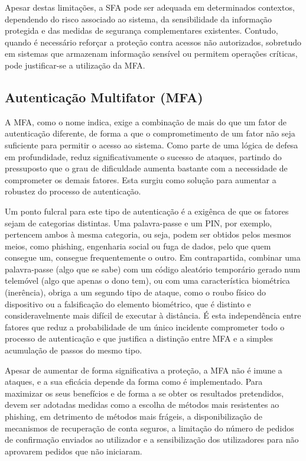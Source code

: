 \hspace{1cm} Apesar destas limitações, a SFA pode ser adequada em determinados contextos, dependendo do risco associado ao sistema, da sensibilidade da informação protegida e das medidas de segurança complementares existentes. Contudo, quando é necessário reforçar a proteção contra acessos não autorizados, sobretudo em sistemas que armazenam informação sensível ou permitem operações críticas, pode justificar-se a utilização da MFA.

\subsection{Autenticação Multifator (MFA)}

\hspace{1cm} A MFA, como o nome indica, exige a combinação de mais do que um fator de autenticação diferente, de forma a que o comprometimento de um fator não seja suficiente para permitir o acesso ao sistema. Como parte de uma lógica de defesa em profundidade, reduz significativamente o sucesso de ataques, partindo do pressuposto que o grau de dificuldade aumenta bastante com a necessidade de comprometer os demais fatores. Esta surgiu como solução para aumentar a robustez do processo de autenticação. 

\hspace{1cm} Um ponto fulcral para este tipo de autenticação é a exigênca de que os fatores sejam de categorias distintas. Uma palavra-passe e um PIN, por exemplo, pertencem ambos à mesma categoria, ou seja, podem ser obtidos pelos mesmos meios, como phishing, engenharia social ou fuga de dados, pelo que quem consegue um, consegue frequentemente o outro. Em contrapartida, combinar uma palavra-passe (algo que se sabe) com um código aleatório temporário gerado num telemóvel (algo que apenas o dono tem), ou com uma característica biométrica (inerência), obriga a um segundo tipo de ataque, como o roubo físico do dispositivo ou a falsificação do elemento biométrico, que é distinto e consideravelmente mais difícil de executar à distância. É esta independência entre fatores que reduz a probabilidade de um único incidente comprometer todo o processo de autenticação e que justifica a distinção entre MFA e a simples acumulação de passos do mesmo tipo.

\hspace{1cm} Apesar de aumentar de forma significativa a proteção, a MFA não é imune a ataques, e a sua eficácia depende da forma como é implementado. Para maximizar os seus benefícios e de forma a se obter os resultados pretendidos, devem ser adotadas medidas como a escolha de métodos mais resistentes ao phishing, em detrimento de métodos mais frágeis, a disponibilização de mecanismos de recuperação de conta seguros, a limitação do número de pedidos de confirmação enviados ao utilizador e a sensibilização dos utilizadores para não aprovarem pedidos que não iniciaram.

